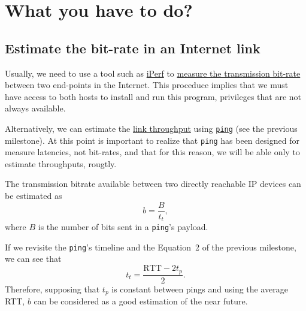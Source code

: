 \section{What you have to do?}

\subsection{Estimate the bit-rate in an Internet link}

Usually, we need to use a tool such as \href{https://iperf.fr/}{iPerf}
to
\href{https://en.wikipedia.org/wiki/Measuring_network_throughput}{measure
  the transmission bit-rate} between two end-points in the
Internet. This proceduce implies that we must have access to both
hosts to install and run this program, privileges that are not always
available.

Alternatively, we can estimate the
\href{https://en.wikipedia.org/wiki/Throughput}{link throughput} using
\href{https://github.com/torvalds/linux/blob/master/net/ipv4/ping.c}{\texttt{ping}}
(see the previous milestone). At this point is important to realize
that \texttt{ping} has been designed for measure latencies, not
bit-rates, and that for this reason, we will be able only to estimate
throughputs, rougtly.

The transmission bitrate available between two directly reachable IP
devices can be estimated as
\begin{equation}
  b=\frac{B}{t_t},
  \label{eq:b}
\end{equation}
where $B$ is the number of bits sent in a \texttt{ping}'s payload.

If we revisite the \texttt{ping}'s timeline and the Equation~2 of
the previous milestone, we can see that
\begin{equation}
  t_t = \frac{\text{RTT}-2t_p}{2}.
  \label{eq:tt}
\end{equation}
Therefore, supposing that $t_p$ is constant between pings and using
the average RTT, $b$ can be considered as a good estimation of the
near future.

